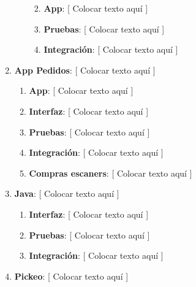 \documentclass{article}
\begin{document}
\begin{enumerate}
\begin{enumerate}[label*=\arabic*.]
					\begin{enumerate}[label*=\arabic*.]
						\itemsep=3pt \topsep=0pt \partopsep=0pt \parskip=0pt \parsep=0pt

						\item \textbf{App}: [ Colocar texto aquí ]

						\item \textbf{Pruebas}: [ Colocar texto aquí ]

						\item \textbf{Integración}: [ Colocar texto aquí ]

					\end{enumerate}

			\end{enumerate}

		\item \textbf{App Pedidos}: [ Colocar texto aquí ]

			\begin{enumerate}[label*=\arabic*.]

				\item \textbf{App}: [ Colocar texto aquí ]
			
				\item \textbf{Interfaz}: [ Colocar texto aquí ]

				\item \textbf{Pruebas}: [ Colocar texto aquí ]

				\item \textbf{Integración}: [ Colocar texto aquí ]

				\item \textbf{Compras escaners}: [ Colocar texto aquí ]

			\end{enumerate}

		\item \textbf{Java}: [ Colocar texto aquí ]

			\begin{enumerate}[label*=\arabic*.]

				\item \textbf{Interfaz}: [ Colocar texto aquí ]
			
				\item \textbf{Pruebas}: [ Colocar texto aquí ]

				\item \textbf{Integración}: [ Colocar texto aquí ]

			\end{enumerate}

		\item \textbf{Pickeo}: [ Colocar texto aquí ]


\end{enumerate}
\end{document}
